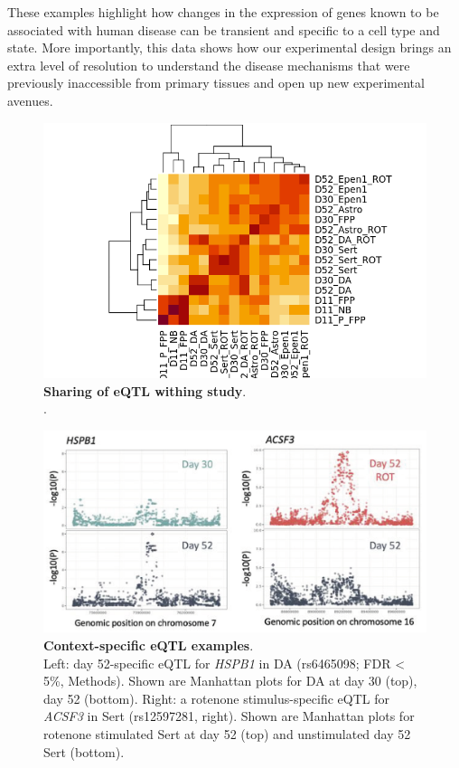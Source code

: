 These examples highlight how changes in the expression of genes known to be associated with human disease can be transient and specific to a cell type and state. More importantly, this data shows how our experimental design brings an extra level of resolution to understand the disease mechanisms that were previously inaccessible from primary tissues and open up new experimental avenues.


\begin{figure}[h]
\centering
\includegraphics[width=16cm]{Chapter5/Fig/neuroseq_eqtl_neuroseq_heatmap.png}
\caption[Sharing of eQTL withing study]{\textbf{Sharing of eQTL withing study}.\\
.}
\label{fig:neuroseq_eqtl_heatmap}
\end{figure}

\begin{figure}[h]
\centering
\includegraphics[width=16cm]{Chapter5/Fig/neuroseq_eqtl_examples.png}
\caption[Context-specific eQTL examples]{\textbf{Context-specific eQTL examples}.\\
Left: day 52-specific eQTL for \textit{HSPB1} in DA (rs6465098; FDR < 5\%, Methods). 
Shown are Manhattan plots for DA at day 30 (top), day 52 (bottom). 
Right: a rotenone stimulus-specific eQTL for \textit{ACSF3} in Sert (rs12597281, right). 
Shown are Manhattan plots for rotenone stimulated Sert at day 52 (top) and unstimulated day 52 Sert (bottom).}
\label{fig:neuroseq_eqtl_examples}
\end{figure}

